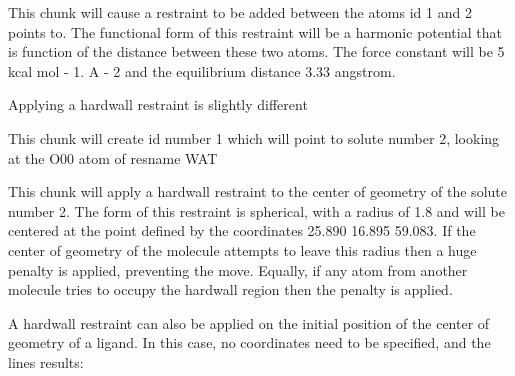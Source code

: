 \documentclass[letterpaper,10pt,english]{sphinxmanual}
\begin{document}
%
\begin{sphinxVerbatim}[commandchars=\\\{\}]
       
\end{sphinxVerbatim}

This chunk will cause a restraint to be added between the atoms id 1 and 2 points to. The functional form of this restraint will be a harmonic potential that is function of the distance between these two atoms. The force constant will be 5 kcal mol - 1. A - 2 and the equilibrium distance 3.33 angstrom.

\ignorespaces 
Applying a hardwall restraint is slightly different

%
\begin{sphinxVerbatim}[commandchars=\\\{\}]
       
\end{sphinxVerbatim}

This chunk will create id number 1 which will point to solute number 2, looking at the O00 atom of resname WAT

%
\begin{sphinxVerbatim}[commandchars=\\\{\}]
       
\end{sphinxVerbatim}

This chunk will apply a hardwall restraint to the center of geometry of the solute number 2. The form of this restraint is spherical, with a radius of 1.8 and will be centered at the point defined by the coordinates 25.890 16.895 59.083. If the center of geometry of the molecule attempts to leave this radius then a huge penalty is applied, preventing the move. Equally, if any atom from another molecule tries to occupy the hardwall region then the penalty is applied.

A hardwall restraint can also be applied on the initial position of the center of geometry of a ligand. In this case, no coordinates need to be specified, and the lines results:

%
\begin{sphinxVerbatim}[commandchars=\\\{\}]
    
\end{sphinxVerbatim}
\end{document}

